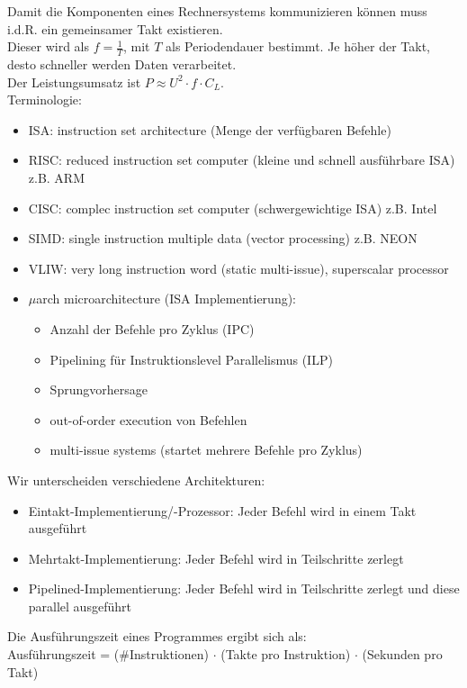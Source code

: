 \documentclass[a4paper,12pt,leqno]{article}
\begin{document}
Damit die Komponenten eines Rechnersystems kommunizieren können muss i.d.R. ein gemeinsamer Takt existieren.\\
Dieser wird als $f=\frac{1}{T}$, mit $T$ als Periodendauer bestimmt. Je höher der Takt, desto schneller werden Daten verarbeitet.\\
Der Leistungsumsatz ist $P\approx U^2 \cdot f \cdot C_L$.\\

Terminologie:
\begin{itemize}
\item ISA: instruction set architecture (Menge der verfügbaren Befehle)
\item RISC: reduced instruction set computer (kleine und schnell ausführbare ISA) z.B. ARM
\item CISC: complec instruction set computer (schwergewichtige ISA) z.B. Intel
\item SIMD: single instruction multiple data (vector processing) z.B. NEON
\item VLIW: very long instruction word (static multi-issue), superscalar processor
\item $\mu$arch microarchitecture (ISA Implementierung):
	\begin{itemize}
	\item Anzahl der Befehle pro Zyklus (IPC)
	\item Pipelining für Instruktionslevel Parallelismus (ILP)
	\item Sprungvorhersage
	\item out-of-order execution von Befehlen 
	\item multi-issue systems (startet mehrere Befehle pro Zyklus)   
	\end{itemize}
\end{itemize}

Wir unterscheiden verschiedene Architekturen:
\begin{itemize}
\item Eintakt-Implementierung/-Prozessor: Jeder Befehl wird in einem Takt ausgeführt
\item Mehrtakt-Implementierung: Jeder Befehl wird in Teilschritte zerlegt
\item Pipelined-Implementierung: Jeder Befehl wird in Teilschritte zerlegt und diese parallel ausgeführt
\end{itemize}

Die Ausführungszeit eines Programmes ergibt sich als:\\
Ausführungszeit = (\#Instruktionen) $\cdot$ (Takte pro Instruktion) $\cdot$ (Sekunden pro Takt)\\
\end{document}
